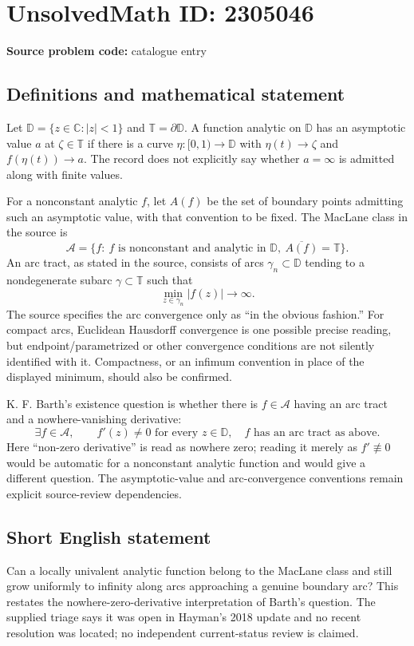 \documentclass[11pt]{article}
\newcommand{\C}{\mathbb{C}}
\begin{document}
\section*{UnsolvedMath ID: 2305046}
\textbf{Source problem code:} catalogue entry
\subsection{Definitions and mathematical statement}
Let $\mathbb D=\{z\in\C:|z|<1\}$ and $\mathbb T=\partial\mathbb D$. A function analytic on $\mathbb D$ has an asymptotic value $a$ at $\zeta\in\mathbb T$ if there is a curve $\eta:[0,1)\to\mathbb D$ with $\eta(t)\to\zeta$ and $f(\eta(t))\to a$. The record does not explicitly say whether $a=\infty$ is admitted along with finite values.

For a nonconstant analytic $f$, let $A(f)$ be the set of boundary points admitting such an asymptotic value, with that convention to be fixed. The MacLane class in the source is
\[
 \mathcal A=\{f:\ f\text{ is nonconstant and analytic in }\mathbb D,
                   \ \overline{A(f)}=\mathbb T\}.
\]
An arc tract, as stated in the source, consists of arcs $\gamma_n\subset\mathbb D$ tending to a nondegenerate subarc $\gamma\subset\mathbb T$ such that
\[
 \min_{z\in\gamma_n}|f(z)|\longrightarrow\infty.
\]
The source specifies the arc convergence only as ``in the obvious fashion.'' For compact arcs, Euclidean Hausdorff convergence is one possible precise reading, but endpoint/parametrized or other convergence conditions are not silently identified with it. Compactness, or an infimum convention in place of the displayed minimum, should also be confirmed.

K. F. Barth's existence question is whether there is $f\in\mathcal A$ having an arc tract and a nowhere-vanishing derivative:
\[
 \exists f\in\mathcal A,\qquad
 f'(z)\ne0\text{ for every }z\in\mathbb D,
 \quad f\text{ has an arc tract as above}.
\]
Here ``non-zero derivative'' is read as nowhere zero; reading it merely as $f'\not\equiv0$ would be automatic for a nonconstant analytic function and would give a different question. The asymptotic-value and arc-convergence conventions remain explicit source-review dependencies.
\subsection{Short English statement}
Can a locally univalent analytic function belong to the MacLane class and still grow uniformly to infinity along arcs approaching a genuine boundary arc? This restates the nowhere-zero-derivative interpretation of Barth's question. The supplied triage says it was open in Hayman's 2018 update and no recent resolution was located; no independent current-status review is claimed.
\end{document}

